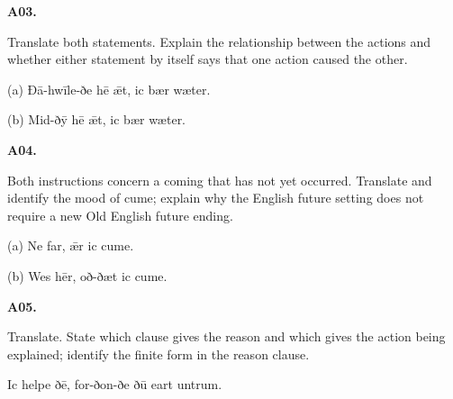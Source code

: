 \par\begin{minipage}{\linewidth}\raggedright
\textbf{A03.}

Translate both statements. Explain the relationship between the actions and whether either statement by itself says that one action caused the other.

(a) Ðā-hwīle-ðe hē ǣt, ic bær wæter.

(b) Mid-ðȳ hē ǣt, ic bær wæter.

\end{minipage}\par\addvspace{4pt}

\par\begin{minipage}{\linewidth}\raggedright
\textbf{A04.}

Both instructions concern a coming that has not yet occurred. Translate and identify the mood of cume; explain why the English future setting does not require a new Old English future ending.

(a) Ne far, ǣr ic cume.

(b) Wes hēr, oð-ðæt ic cume.

\end{minipage}\par\addvspace{4pt}

\par\begin{minipage}{\linewidth}\raggedright
\textbf{A05.}

Translate. State which clause gives the reason and which gives the action being explained; identify the finite form in the reason clause.

Ic helpe ðē, for-ðon-ðe ðū eart untrum.

\end{minipage}\par\addvspace{4pt}

